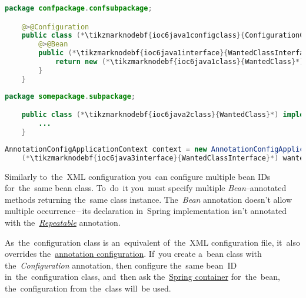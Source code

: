 \begin{lstlisting}[language=Java, title={Configuration class}]
    package confpackage.confsubpackage;

    @>@Configuration
    public class (*\tikzmarknodebf{ioc6java1configclass}{ConfigurationClass}*) {
        @>@Bean
        public (*\tikzmarknodebf{ioc6java1interface}{WantedClassInterface}*) (*\tikzmarknodebf{ioc6java1beanid}{wantedBeanMethod}*)() {
            return new (*\tikzmarknodebf{ioc6java1class}{WantedClass}*)();
        }
    }
\end{lstlisting}
\begin{lstlisting}[language=Java, title={Wanted class}]
    package somepackage.subpackage;

    public class (*\tikzmarknodebf{ioc6java2class}{WantedClass}*) implements (*\tikzmarknodebf{ioc6java2interface}{WantedClassInterface}*) {
        ...
    }
\end{lstlisting}
\begin{lstlisting}[language=Java, title={Usage}]
    AnnotationConfigApplicationContext context = new AnnotationConfigApplicationContext((*\tikzmarknodebf{ioc6java3configclass}{ConfigurationClass}*).class);
    (*\tikzmarknodebf{ioc6java3interface}{WantedClassInterface}*) wantedClassInstance = context.getBean("(*\tikzmarknodebf{ioc6java3beanid}{wantedBeanMethod}[ForestGreen]*)", (*\tikzmarknodebf{ioc6java3interface2}{WantedClassInterface}*).class);
\end{lstlisting}

\noindent Similarly to~the~XML configuration you~can configure multiple bean IDs for~the~same bean class.
To~do~it you~must specify multiple \textit{Bean}--annotated methods returning the~same class instance.
The~\textit{Bean} annotation doesn't allow multiple occurrence\,--\,its declaration in~Spring implementation isn't annotated with the~\hyperref[annotationsrepeatable]{\textit{Repeatable}} annotation.

\warning As~the~configuration class is an~equivalent of~the~XML configuration file, it~also overrides the~\hyperref[iocannotations]{annotation configuration}.
If~you create a~bean class with the~\textit{Configuration} annotation, then configure the~same bean~ID in~the~configuration class, and~then ask the~\hyperref[springcontainrer]{Spring container} for~the~bean, the~configuration from the~class will~be used.
\newpage
